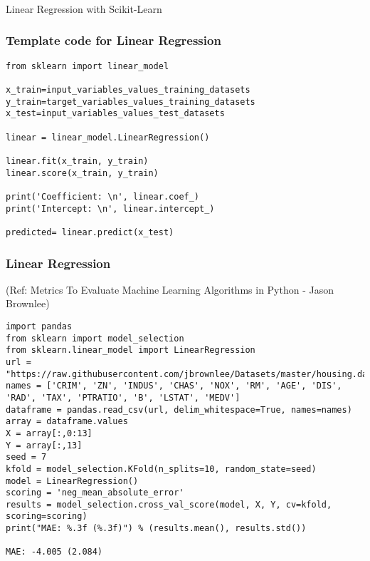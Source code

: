 \begin{frame}[fragile]\frametitle{}
\begin{center}
{\Large Linear Regression with Scikit-Learn}
\end{center}
\end{frame}

\begin{frame}[fragile]\frametitle{Template code for Linear Regression}
\begin{lstlisting}
from sklearn import linear_model 

x_train=input_variables_values_training_datasets 
y_train=target_variables_values_training_datasets 
x_test=input_variables_values_test_datasets 

linear = linear_model.LinearRegression() 

linear.fit(x_train, y_train) 
linear.score(x_train, y_train) 

print('Coefficient: \n', linear.coef_) 
print('Intercept: \n', linear.intercept_) 

predicted= linear.predict(x_test)
\end{lstlisting}
\end{frame}


\begin{frame}[fragile]\frametitle{Linear Regression}
{\tiny (Ref: Metrics To Evaluate Machine Learning Algorithms in Python - Jason Brownlee)}

\begin{lstlisting}
import pandas
from sklearn import model_selection
from sklearn.linear_model import LinearRegression
url = "https://raw.githubusercontent.com/jbrownlee/Datasets/master/housing.data"
names = ['CRIM', 'ZN', 'INDUS', 'CHAS', 'NOX', 'RM', 'AGE', 'DIS', 'RAD', 'TAX', 'PTRATIO', 'B', 'LSTAT', 'MEDV']
dataframe = pandas.read_csv(url, delim_whitespace=True, names=names)
array = dataframe.values
X = array[:,0:13]
Y = array[:,13]
seed = 7
kfold = model_selection.KFold(n_splits=10, random_state=seed)
model = LinearRegression()
scoring = 'neg_mean_absolute_error'
results = model_selection.cross_val_score(model, X, Y, cv=kfold, scoring=scoring)
print("MAE: %.3f (%.3f)") % (results.mean(), results.std())

MAE: -4.005 (2.084)
\end{lstlisting}



\end{frame}






